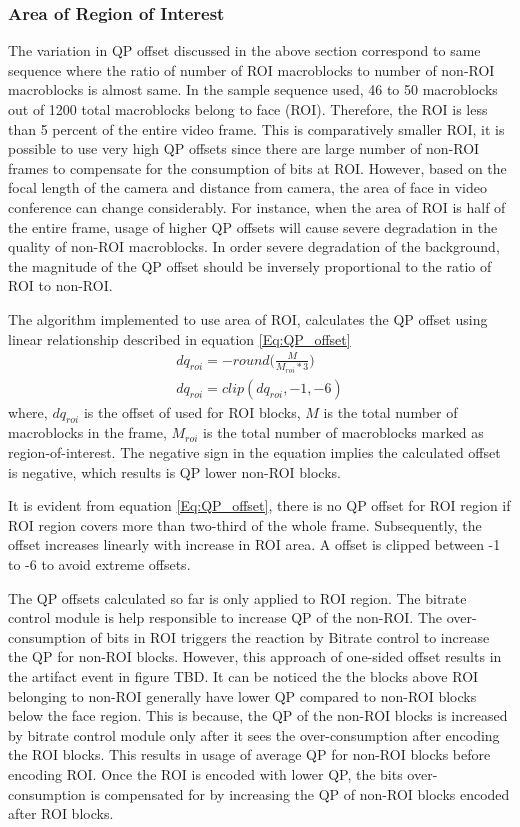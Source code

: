 \documentclass[11pt]{article} %
\begin{document}
\subsubsection{Area of Region of Interest}
The variation in QP offset discussed in the above section correspond to same sequence where the ratio of number of ROI macroblocks to number of non-ROI macroblocks is almost same. In the sample sequence used, 46 to 50 macroblocks out of 1200 total macroblocks belong to face (ROI). Therefore, the ROI is less than 5 percent of the entire video frame. This is comparatively smaller ROI, it is possible to use very high QP offsets since there are large number of non-ROI frames to compensate for the consumption of bits at ROI. However, based on the focal length of the camera and distance from camera, the area of face in video conference can change considerably. For instance, when the area of ROI is half of the entire frame, usage of higher QP offsets will cause severe degradation in the quality of non-ROI macroblocks. In order severe degradation of the background, the magnitude of the QP offset should be inversely proportional to the ratio of ROI to non-ROI.

The algorithm implemented to use area of ROI, calculates the QP offset using linear relationship described in equation \ref{Eq:QP_offset}
\begin{equation}
	\label{Eq:QP_offset}
	\begin{aligned}
	dq_{roi} = -round\Big(\frac{M}{M_{roi} * 3}\Big) \\
	dq_{roi} = clip(dq_{roi}, -1 , -6)
	\end{aligned}	
\end{equation}
where, $dq_{roi}$ is the offset of used for ROI blocks, $M$ is the total number of macroblocks in the frame, $M_{roi}$ is the total number of macroblocks marked as region-of-interest. The negative sign in the equation implies the calculated offset is negative, which results is QP lower non-ROI blocks. 

It is evident from equation \ref{Eq:QP_offset}, there is no QP offset for ROI region if ROI region covers more than two-third of the whole frame. Subsequently, the offset increases linearly with increase in ROI area. A offset is clipped between -1 to -6 to avoid extreme offsets.

The QP offsets calculated so far is only applied to ROI region. The bitrate control module is help responsible to increase QP of the non-ROI. The over-consumption of bits in ROI triggers the reaction by Bitrate control to increase the QP for non-ROI blocks. However, this approach of one-sided offset results in the artifact event in figure TBD. It can be noticed the the blocks above ROI belonging to non-ROI generally have lower QP compared to non-ROI blocks below the face region. This is because, the QP of the non-ROI blocks is increased by bitrate control module only after it sees the over-consumption after encoding the ROI blocks. This results in usage of average QP for non-ROI blocks before encoding ROI. Once the ROI is encoded with lower QP, the bits over-consumption is compensated for by increasing the QP of non-ROI blocks encoded after ROI blocks.
\end{document}
